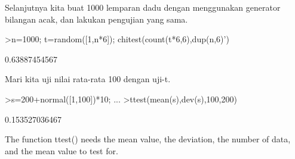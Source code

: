 \documentclass[a4paper,10pt]{article}
\begin{document}
\begin{eulernotebook}
\begin{eulercomment}
\begin{eulercomment}
\begin{eulercomment}
\begin{eulercomment}
\begin{eulercomment}
\begin{eulercomment}
\begin{eulercomment}
\begin{eulercomment}
\begin{eulercomment}
\begin{eulercomment}
\begin{eulercomment}
\begin{eulercomment}
\begin{eulercomment}
\begin{eulercomment}
\begin{eulercomment}
\begin{eulercomment}
\begin{eulercomment}
\begin{eulercomment}
\begin{eulercomment}
Selanjutnya kita buat 1000 lemparan dadu dengan menggunakan generator
bilangan acak, dan lakukan pengujian yang sama.
\end{eulercomment}
\begin{eulerprompt}
>n=1000; t=random([1,n*6]); chitest(count(t*6,6),dup(n,6)')
\end{eulerprompt}
\begin{euleroutput}
  0.63887454567
\end{euleroutput}
\begin{eulercomment}
Mari kita uji nilai rata-rata 100 dengan uji-t.
\end{eulercomment}
\begin{eulerprompt}
>s=200+normal([1,100])*10; ...
>ttest(mean(s),dev(s),100,200)
\end{eulerprompt}
\begin{euleroutput}
  0.153527036467
\end{euleroutput}
\begin{eulercomment}
The function ttest() needs the mean value, the deviation, the number
of data, and the mean value to test for.


\end{eulercomment}
\end{eulercomment}
\end{eulercomment}
\end{eulercomment}
\end{eulercomment}
\end{eulercomment}
\end{eulercomment}
\end{eulercomment}
\end{eulercomment}
\end{eulercomment}
\end{eulercomment}
\end{eulercomment}
\end{eulercomment}
\end{eulercomment}
\end{eulercomment}
\end{eulercomment}
\end{eulercomment}
\end{eulercomment}
\end{eulercomment}
\end{eulernotebook}
\end{document}
